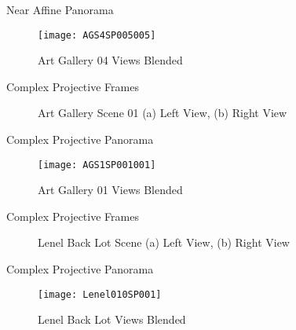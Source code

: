 \documentclass{beamer}
\begin{document}
\begin{frame}[c]{\sc Near Affine Panorama}

\begin{figure}[!h]
\centering
\texttt{[image: AGS4SP005005]}
\caption{Art Gallery 04 Views Blended}
\label{ArtGallery4Stitched}
\end{figure}

\end{frame}


\begin{frame}[c]{\sc Complex Projective Frames}

\begin{figure}[!h]
\centering
{}
\caption{Art Gallery Scene 01 (a) Left View, (b) Right View}
\label{ArtGallery1Images}
\end{figure}

\end{frame}

\begin{frame}[c]{\sc Complex Projective Panorama}

\begin{figure}[!h]
\centering
\texttt{[image: AGS1SP001001]}
\caption{Art Gallery 01 Views Blended}
\label{ArtGallery1Stitched}
\end{figure}

\end{frame}


\begin{frame}[c]{\sc Complex Projective Frames}

\begin{figure}[!h]
\centering
{}
\caption{Lenel Back Lot Scene (a) Left View, (b) Right View}
\label{Lenel10Images}
\end{figure}

\end{frame}

\begin{frame}[c]{\sc Complex Projective Panorama}

\begin{figure}[!h]
\centering
\texttt{[image: Lenel010SP001]}
\caption{Lenel Back Lot Views Blended}
\label{Lenel10Stitched}
\end{figure}

\end{frame}
\end{document}
